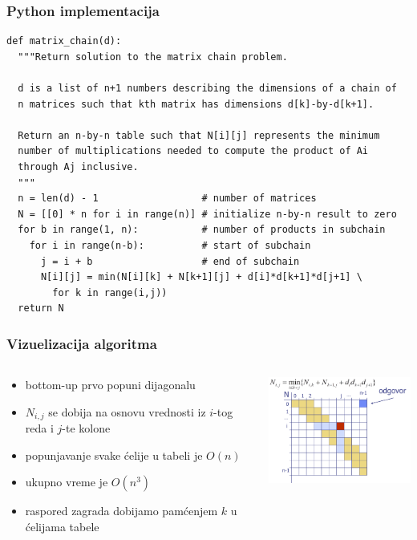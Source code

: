 \documentclass[compress]{beamer}
\begin{document}
\begin{frame}[fragile,shrink=15]
  \frametitle{Python implementacija}
\begin{verbatim}
def matrix_chain(d):
  """Return solution to the matrix chain problem.

  d is a list of n+1 numbers describing the dimensions of a chain of
  n matrices such that kth matrix has dimensions d[k]-by-d[k+1].
 
  Return an n-by-n table such that N[i][j] represents the minimum 
  number of multiplications needed to compute the product of Ai 
  through Aj inclusive.
  """
  n = len(d) - 1                  # number of matrices
  N = [[0] * n for i in range(n)] # initialize n-by-n result to zero
  for b in range(1, n):           # number of products in subchain
    for i in range(n-b):          # start of subchain
      j = i + b                   # end of subchain
      N[i][j] = min(N[i][k] + N[k+1][j] + d[i]*d[k+1]*d[j+1] \
        for k in range(i,j))
  return N
\end{verbatim}
\end{frame}

\begin{frame}
  \frametitle{Vizuelizacija algoritma}
  \begin{columns}
    \begin{column}[t]{6cm}
      \begin{itemize}
        \item bottom-up prvo popuni dijagonalu
        \item $N_{i,j}$ se dobija na osnovu vrednosti iz $i$-tog reda i 
        $j$-te kolone
        \item popunjavanje svake ćelije u tabeli je $O(n)$
        \item ukupno vreme je $O(n^3)$
        \item raspored zagrada dobijamo pamćenjem $k$ u ćelijama tabele
      \end{itemize}
    \end{column}
    \begin{column}[t]{6cm}
      \begin{center}
        \includegraphics[width=6cm]{asp-13-pic09.png}
      \end{center}
    \end{column}
  \end{columns}
\end{frame}
\end{document}
